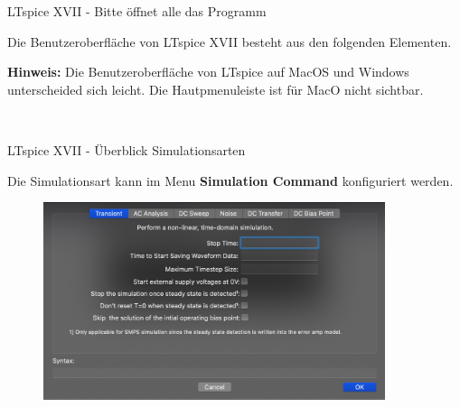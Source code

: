 \documentclass{beamer}
\begin{document}
\begin{frame}[fragile]{LTspice XVII - Bitte öffnet alle das Programm}
	
Die Benutzeroberfläche von LTspice XVII besteht aus den folgenden Elementen.
\begin{spacing}{0.6} \begin{tiny} \textbf{Hinweis:} Die Benutzeroberfläche von LTspice auf MacOS und Windows unterscheided sich leicht. 
  Die Hautpmenuleiste ist für MacO nicht sichtbar.
  \end{tiny} \end{spacing}

\begin{figure}
  \centering
  \\
  \qquad    
\end{figure}

  \end{frame}

  \begin{frame}{LTspice XVII - Überblick Simulationsarten}

    Die Simulationsart kann im Menu \textbf{Simulation Command} konfiguriert werden. 

    \begin{figure}
      \centering
      \includegraphics[width=10cm]{pictures/simulationcmd.png}
    \end{figure}
    
  \end{frame}
\end{document}
